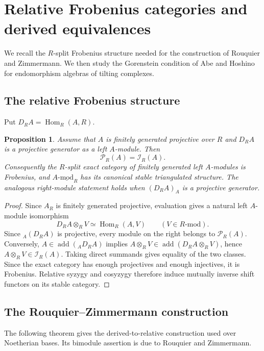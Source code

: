 \documentclass[12pt,a4paper,english,reqno]{amsart}
\numberwithin{equation}{section}
\theoremstyle{plain}
\newtheorem{proposition}[theorem]{Proposition}
\theoremstyle{definition}
\begin{document}
\section{Relative Frobenius categories and derived equivalences}
\label{sec:relative-frobenius-derived}

We recall the $R$-split Frobenius structure needed for the
construction of Rouquier and Zimmermann. We then study the
Gorenstein condition of Abe and Hoshino for endomorphism
algebras of tilting complexes.

\subsection{The relative Frobenius structure}

Put $D_RA=\operatorname{Hom}_R(A,R)$.

\begin{proposition}\label{prop:relative-frobenius-criterion}
Assume that $A$ is finitely generated projective over $R$ and
$D_RA$ is a projective generator as a left $A$-module.  Then
\[
 \mathcal P_R(A)=\mathcal I_R(A).
\]
Consequently the $R$-split exact category of finitely generated
left $A$-modules is Frobenius, and
$A\text{-}\underline{\mathrm{mod}}_R$ has its canonical stable
triangulated structure.  The analogous right-module statement
holds when $(D_RA)_A$ is a projective generator.
\end{proposition}

\begin{proof}
Since $A_R$ is finitely generated projective, evaluation gives a
natural left $A$-module isomorphism
\[
 D_RA\otimes_RV\simeq\operatorname{Hom}_R(A,V)
 \qquad (V\in R\text{-}\mathrm{mod}).
\]
Since ${}_A(D_RA)$ is projective, every module on the right belongs
to $\mathcal P_R(A)$.  Conversely,
$A\in\operatorname{add}({}_A D_RA)$ implies
$A\otimes_RV\in\operatorname{add}(D_RA\otimes_RV)$, hence
$A\otimes_RV\in\mathcal I_R(A)$.  Taking direct summands gives
equality of the two classes.  Since
the exact category has enough projectives and enough injectives,
it is Frobenius.  Relative syzygy and cosyzygy therefore induce
mutually inverse shift functors on its stable category.
\end{proof}

\subsection{The Rouquier--Zimmermann construction}

The following theorem gives the derived-to-relative construction
used over Noetherian bases.  Its bimodule assertion is due to
Rouquier and Zimmermann.
\end{document}
